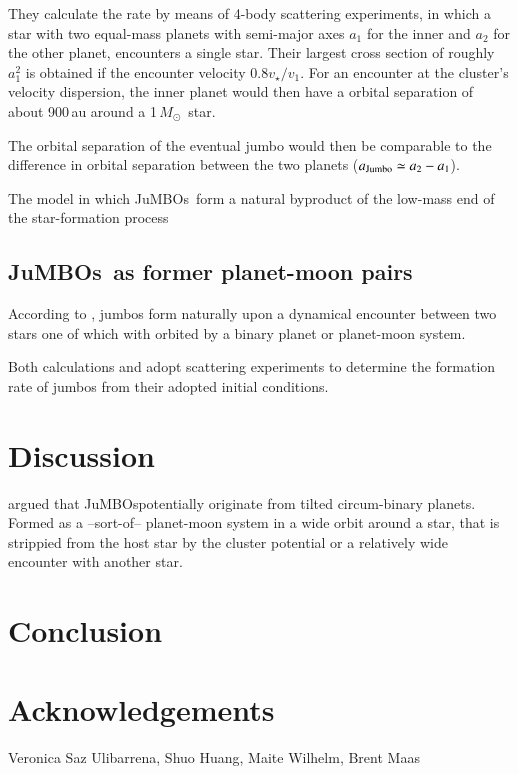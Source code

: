 \documentclass[aa]{aa}
\newcommand{\MSun}{\mbox{${M}_\odot$}}
\newcommand{\jumbos}{\mbox{JuMBOs}}
\begin{document}
They calculate the rate by means of 4-body scattering experiments, in
which a star with two equal-mass planets with semi-major axes $a_1$
for the inner and $a_2$ for the other planet, encounters a single
star. Their largest cross section of roughly $a_1^2$ is obtained if
the encounter velocity $0.8v_\star/v_1$. For an encounter at the
cluster's velocity dispersion, the inner planet would then have a
orbital separation of about 900\,au around a 1\,\MSun\, star.

The orbital separation of the eventual jumbo would then be comparable
to the difference in orbital separation between the two planets
($a_{\rm Jumbo} \simeq a_2-a_1$).

The model in which \jumbos\, form a natural byproduct of the low-mass
end of the star-formation process




\subsection{\jumbos\, as former planet-moon pairs}

According to \cite{2023arXiv231015603C}, jumbos form naturally upon a
dynamical encounter between two stars one of which with orbited by a
binary planet or planet-moon system.

Both calculations \cite{2023arXiv231006016W} and
\cite{2023arXiv231015603C} adopt scattering experiments to determine
the formation rate of jumbos from their adopted initial conditions.


\section{Discussion}

\cite{2023arXiv231015603C} argued that \jumbos potentially originate
from tilted circum-binary planets. Formed as a --sort-of-- planet-moon
system in a wide orbit around a star, that is strippied from the host
star by the cluster potential or a relatively wide encounter with
another star. 



\section{Conclusion}

\section*{Acknowledgements}

Veronica Saz Ulibarrena, Shuo Huang, Maite Wilhelm, Brent Maas
    

    
\end{document}
